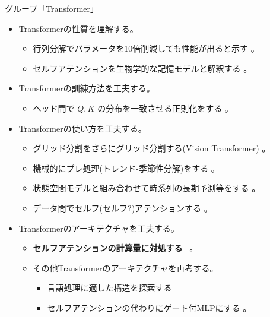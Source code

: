\documentclass[b5paper,xelatex,ja=standard,10pt]{bxjsarticle}
\begin{document}
\vspace{1pt}
\begin{PROP}[left=0pt]{グループ「Transformer」}
\begin{itemize}
  \item Transformerの性質を理解する。
    \begin{itemize}
    \item 行列分解でパラメータを10倍削減しても性能が出ると示す \cite{AliakbarPanahi2021}。
    \item セルフアテンションを生物学的な記憶モデルと解釈する \cite{TrentonBricken2021}。
  \end{itemize}
  \vspace{6pt}
  \item Transformerの訓練方法を工夫する。
  \begin{itemize}
    \item ヘッド間で $Q, K$ の分布を一致させる正則化をする \cite{ShujianZhang2021}。
  \end{itemize}
  \vspace{6pt}
  \item Transformerの使い方を工夫する。
  \begin{itemize}
    \item グリッド分割をさらにグリッド分割する(Vision Transformer) \cite{KaiHan2021}。
    \item 機械的にプレ処理(トレンド-季節性分解)をする \cite{HaixuWu2021}。
    \item 状態空間モデルと組み合わせて時系列の長期予測等をする \cite{BinhTang2021}。
    \item データ間でセルフ(セルフ?)アテンションする \cite{JannikKossen2021}。
  \end{itemize}
  \vspace{6pt}
  \item Transformerのアーキテクチャを工夫する。
  \begin{itemize}
    \item \textbf{セルフアテンションの計算量に対処する} \cite{YifanChen2021} \cite{XuezheMa2021} \cite{SubhabrataDutta2021} \cite{SebastianJaszczur2021} \cite{BeidiChen2021} \cite{ChenZhu2021} \cite{HongyuRen2021} \, \cite{ShengjieLuo2021} \cite{TanNguyen2021}。
    \item その他Transformerのアーキテクチャを再考する。
    \begin{itemize}
      \item 言語処理に適した構造を探索する \cite{DavidSo2021}
      \item セルフアテンションの代わりにゲート付MLPにする \cite{HanxiaoLiu2021}。

\end{itemize}
\end{itemize}
\end{itemize}
\end{PROP}
\end{document}
